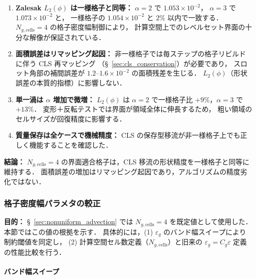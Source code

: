 \begin{enumerate}[noitemsep]
  \item \textbf{Zalesak $L_2(\phi)$ は一様格子と同等：}
        $\alpha = 2$ で $1.053 \times 10^{-2}$，
        $\alpha = 3$ で $1.073 \times 10^{-2}$ と，
        一様格子の $1.054 \times 10^{-2}$ と $2\%$ 以内で一致する．
        $N_{g,\text{cells}} = 4$ の格子密度幅制御により，
        計算空間上でのレベルセット界面の十分な解像が保証されている．
  \item \textbf{面積誤差はリマッピング起因：}
        非一様格子では毎ステップの格子リビルドに伴う CLS 再マッピング
        （§~\ref{sec:cls_conservation}）が必要であり，
        スロット角部の補間誤差が $1.2\text{--}1.6 \times 10^{-2}$ の面積残差を生じる．
        $L_2(\phi)$（形状誤差の本質的指標）に影響しない．
  \item \textbf{単一渦は $\alpha$ 増加で微増：}
        $L_2(\phi)$ は $\alpha = 2$ で一様格子比 $+9\%$，$\alpha = 3$ で $+13\%$．
        変形＋反転テストでは界面が領域全体に伸長するため，
        粗い領域のセルサイズが回復精度に影響する．
  \item \textbf{質量保存は全ケースで機械精度：}
        CLS の保存型移流が非一様格子上でも正しく機能することを確認した．
\end{enumerate}

\noindent\textbf{結論：}
$N_{g,\text{cells}} = 4$ の界面適合格子は，CLS 移流の形状精度を一様格子と同等に維持する．
面積誤差の増加はリマッピング起因であり，アルゴリズムの精度劣化ではない．


\subsubsection{格子密度幅パラメタの較正}
\label{sec:grid_calibration}

\noindent\textbf{目的：}
§~\ref{sec:nonuniform_advection} では $N_{g,\text{cells}} = 4$ を既定値として使用した．
本節ではこの値の根拠を示す．
具体的には，(1) $\varepsilon_g$ のバンド幅スイープにより制約閾値を同定し，
(2) 計算空間セル数定義（$N_{g,\text{cells}}$）と旧来の
$\varepsilon_g = C_g \varepsilon$ 定義の性能比較を行う．

\paragraph{バンド幅スイープ}

